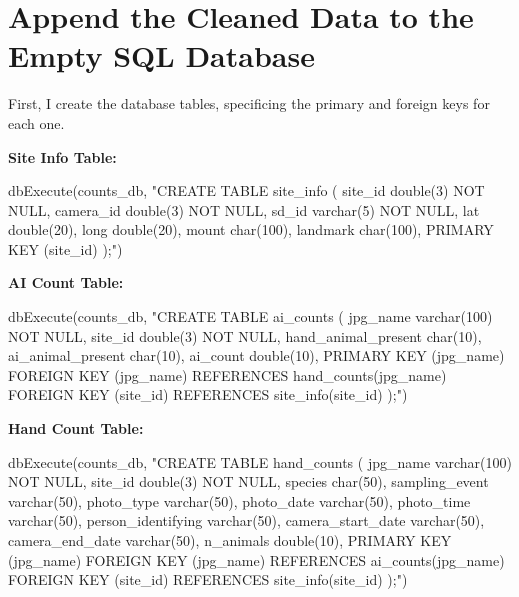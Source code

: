 \documentclass[
]{book}
\newenvironment{Shaded}{\begin{snugshade}}{\end{snugshade}}
\newcommand{\FunctionTok}[1]{\textcolor[rgb]{0.00,0.00,0.00}{#1}}
\newcommand{\NormalTok}[1]{#1}
\newcommand{\StringTok}[1]{\textcolor[rgb]{0.31,0.60,0.02}{#1}}
\begin{document}
\hypertarget{append-the-cleaned-data-to-the-empty-sql-database}{%
\section{Append the Cleaned Data to the Empty SQL Database}\label{append-the-cleaned-data-to-the-empty-sql-database}}

First, I create the database tables, specificing the primary and foreign keys for each one.

\textbf{Site Info Table:}

\begin{Shaded}
\begin{Highlighting}[]
\FunctionTok{dbExecute}\NormalTok{(counts\_db, }
\StringTok{"CREATE TABLE site\_info (}
\StringTok{ site\_id double(3) NOT NULL,}
\StringTok{ camera\_id double(3) NOT NULL,}
\StringTok{ sd\_id varchar(5) NOT NULL,}
\StringTok{ lat double(20),}
\StringTok{ long double(20),}
\StringTok{ mount char(100),}
\StringTok{ landmark   char(100),}
\StringTok{ PRIMARY KEY (site\_id)}
\StringTok{);"}\NormalTok{)}
\end{Highlighting}
\end{Shaded}

\textbf{AI Count Table:}

\begin{Shaded}
\begin{Highlighting}[]
\FunctionTok{dbExecute}\NormalTok{(counts\_db, }
\StringTok{"CREATE TABLE ai\_counts (}
\StringTok{ jpg\_name varchar(100) NOT NULL,}
\StringTok{ site\_id double(3) NOT NULL,}
\StringTok{ hand\_animal\_present char(10),}
\StringTok{ ai\_animal\_present char(10),}
\StringTok{ ai\_count double(10),}
\StringTok{ PRIMARY KEY (jpg\_name)}
\StringTok{ FOREIGN KEY (jpg\_name) REFERENCES hand\_counts(jpg\_name)}
\StringTok{ FOREIGN KEY (site\_id) REFERENCES site\_info(site\_id)}
\StringTok{);"}\NormalTok{)}
\end{Highlighting}
\end{Shaded}

\textbf{Hand Count Table:}

\begin{Shaded}
\begin{Highlighting}[]
\FunctionTok{dbExecute}\NormalTok{(counts\_db, }
\StringTok{"CREATE TABLE hand\_counts (}
\StringTok{ jpg\_name varchar(100) NOT NULL,}
\StringTok{ site\_id double(3) NOT NULL,}
\StringTok{ species char(50),}
\StringTok{ sampling\_event varchar(50),}
\StringTok{ photo\_type varchar(50),}
\StringTok{ photo\_date varchar(50),}
\StringTok{ photo\_time varchar(50),}
\StringTok{ person\_identifying varchar(50),}
\StringTok{ camera\_start\_date varchar(50),}
\StringTok{ camera\_end\_date varchar(50),}
\StringTok{ n\_animals double(10),}
\StringTok{ PRIMARY KEY (jpg\_name)}
\StringTok{ FOREIGN KEY (jpg\_name) REFERENCES ai\_counts(jpg\_name)}
\StringTok{ FOREIGN KEY (site\_id) REFERENCES site\_info(site\_id)}
\StringTok{);"}\NormalTok{)}
\end{Highlighting}
\end{Shaded}
\end{document}
